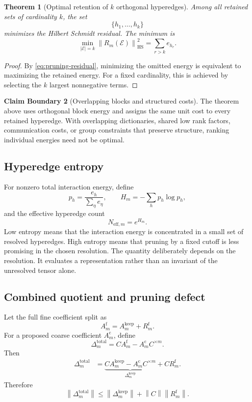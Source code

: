 \documentclass[11pt]{article}
\newtheorem{theorem}{Theorem}[section]
\theoremstyle{definition}
\newtheorem{boundary}[theorem]{Claim Boundary}
\theoremstyle{remark}
\newcommand{\cE}{\mathcal E}
\newcommand{\norm}[1]{\left\lVert #1\right\rVert}
\newcommand{\fine}{\mathrm f}
\newcommand{\coarse}{\mathrm c}
\begin{document}
\begin{theorem}[Optimal retention of $k$ orthogonal hyperedges]\label{thm:best-k-hyperedges}
Among all retained sets of cardinality $k$, the set
\[
  \{h_1,\ldots,h_k\}
\]
minimizes the Hilbert Schmidt residual.  The minimum is
\begin{equation}\label{eq:best-k-residual}
  \boxed{
  \min_{|\cE|=k}
  \norm{R_m(\cE)}_{\mathrm{HS}}^2
  =
  \sum_{r>k}e_{h_r}.}
\end{equation}
\end{theorem}

\begin{proof}
By \eqref{eq:pruning-residual}, minimizing the omitted energy is equivalent to maximizing the retained energy.  For a fixed cardinality, this is achieved by selecting the $k$ largest nonnegative terms.
\end{proof}

\begin{boundary}[Overlapping blocks and structured costs]
The theorem above uses orthogonal block energy and assigns the same unit cost to every retained hyperedge.  With overlapping dictionaries, shared low rank factors, communication costs, or group constraints that preserve structure, ranking individual energies need not be optimal.
\end{boundary}

\subsection{Hyperedge entropy}
For nonzero total interaction energy, define
\[
  p_h=\frac{e_h}{\sum_{\eta}e_{\eta}},
  \qquad
  H_m=-\sum_hp_h\log p_h,
\]
and the effective hyperedge count
\[
  N_{\mathrm{eff},m}=e^{H_m}.
\]
Low entropy means that the interaction energy is concentrated in a small set of resolved hyperedges.  High entropy means that pruning by a fixed cutoff is less promising in the chosen resolution.  The quantity deliberately depends on the resolution.  It evaluates a representation rather than an invariant of the unresolved tensor alone.

\subsection{Combined quotient and pruning defect}
Let the full fine coefficient split as
\[
  A_m^{\fine}
  =A_m^{\mathrm{keep}}+R_m^{\fine}.
\]
For a proposed coarse coefficient $A_m^{\coarse}$, define
\[
  \Delta_m^{\mathrm{total}}
  =CA_m^{\fine}-A_m^{\coarse}C^{\times m}.
\]
Then
\begin{align}
  \Delta_m^{\mathrm{total}}
  &=
  \underbrace{CA_m^{\mathrm{keep}}-A_m^{\coarse}C^{\times m}}
  _{\Delta_m^{\mathrm{keep}}}
  +CR_m^{\fine}.
  \label{eq:combined-pruning-quotient}
\end{align}
Therefore
\begin{equation}\label{eq:combined-pruning-bound}
  \boxed{
  \norm{\Delta_m^{\mathrm{total}}}
  \leq
  \norm{\Delta_m^{\mathrm{keep}}}
  +\norm{C}\norm{R_m^{\fine}}.}
\end{equation}
\end{document}
